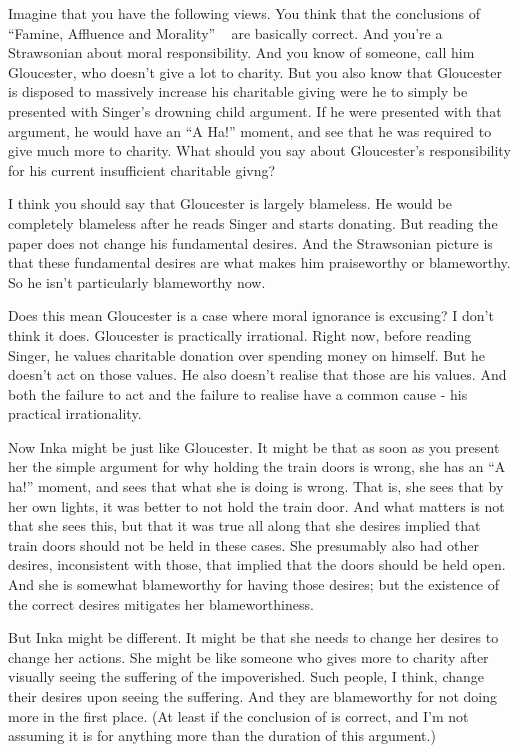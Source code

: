 Imagine that you have the following views. You think that the conclusions of ``Famine, Affluence and Morality'' ~\citep{SingerFAM} are basically correct. And you're a Strawsonian about moral responsibility. And you know of someone, call him \gls{Gloucester}, who doesn't give a lot to charity. But you also know that \gls{Gloucester} is disposed to massively increase his charitable giving were he to simply be presented with Singer's drowning child argument. If he were presented with that argument, he would have an ``A Ha!'' moment, and see that he was required to give much more to charity. What should you say about \gls{Gloucester}'s responsibility for his current insufficient charitable givng?

I think you should say that \gls{Gloucester} is largely blameless. He would be completely blameless after he reads Singer and starts donating. But reading the paper does not change his fundamental desires. And the Strawsonian picture is that these fundamental desires are what makes him praiseworthy or blameworthy. So he isn't particularly blameworthy now.

Does this mean \gls{Gloucester} is a case where moral ignorance is excusing? I don't think it does. \gls{Gloucester} is practically irrational. Right now, before reading Singer, he values charitable donation over spending money on himself. But he doesn't act on those values. He also doesn't realise that those are his values. And both the failure to act and the failure to realise have a common cause - his practical irrationality.

Now \gls{Inka} might be just like \gls{Gloucester}. It might be that as soon as you present her the simple argument for why holding the train doors is wrong, she has an ``A ha!'' moment, and sees that what she is doing is wrong. That is, she sees that by her own lights, it was better to not hold the train door. And what matters is not that she sees this, but that it was true all along that she desires implied that train doors should not be held in these cases. She presumably also had other desires, inconsistent with those, that implied that the doors should be held open. And she is somewhat blameworthy for having those desires; but the existence of the correct desires mitigates her blameworthiness.

But \gls{Inka} might be different. It might be that she needs to change her desires to change her actions. She might be like someone who gives more to charity after visually seeing the suffering of the impoverished. Such people, I think, change their desires upon seeing the suffering. And they are blameworthy for not doing more in the first place. (At least if the conclusion of \citet{SingerFAM} is correct, and I'm not assuming it is for anything more than the duration of this argument.)

